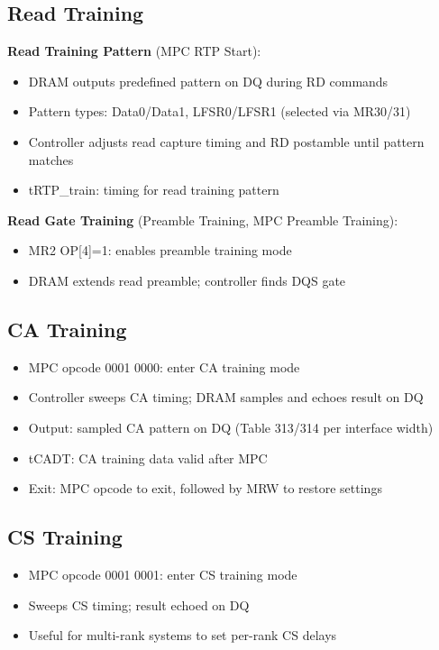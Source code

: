 \documentclass[10pt,a4paper,twoside]{article}
\begin{document}
\subsection{Read Training}

\textbf{Read Training Pattern} (MPC RTP Start):
\begin{itemize}
  \item DRAM outputs predefined pattern on DQ during RD commands
  \item Pattern types: Data0/Data1, LFSR0/LFSR1 (selected via MR30/31)
  \item Controller adjusts read capture timing and RD postamble until pattern matches
  \item tRTP\_train: timing for read training pattern
\end{itemize}

\textbf{Read Gate Training} (Preamble Training, MPC Preamble Training):
\begin{itemize}
  \item MR2 OP[4]=1: enables preamble training mode
  \item DRAM extends read preamble; controller finds DQS gate
\end{itemize}

\subsection{CA Training}

\begin{itemize}
  \item MPC opcode 0001 0000: enter CA training mode
  \item Controller sweeps CA timing; DRAM samples and echoes result on DQ
  \item Output: sampled CA pattern on DQ (Table 313/314 per interface width)
  \item tCADT: CA training data valid after MPC
  \item Exit: MPC opcode to exit, followed by MRW to restore settings
\end{itemize}

\subsection{CS Training}

\begin{itemize}
  \item MPC opcode 0001 0001: enter CS training mode
  \item Sweeps CS timing; result echoed on DQ
  \item Useful for multi-rank systems to set per-rank CS delays
\end{itemize}
\end{document}
